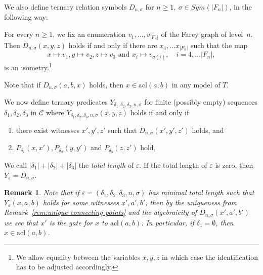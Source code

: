 \documentclass[10pt,a4paper]{amsart}
\renewcommand{\d}{\delta}
\renewcommand{\epsilon}{\varepsilon}
\newcommand{\C}{\mathcal{C}}
\newcommand{\acl}{\mathrm{acl}}
\newtheorem{remark}[defi]{Remark}
\begin{document}
We also define ternary relation symbols $D_{n,\sigma}$ for $n\geq 1,\ \sigma\in Sym(|F_n|)$, in the following way:

For every $n\geq 1$, we fix an enumeration $v_1,\ldots, v_{|F_n|}$ of the Farey graph of level~$n$. 
Then $D_{n,\sigma}(x,y,z)$ holds if and only if there are $x_4,\ldots x_{|F_n|}$ such that the map
\[x\mapsto v_1, y\mapsto v_2, z\mapsto v_3\mbox{\  and \ }x_i\mapsto v_{\sigma(i)},\quad i=4,\ldots |F_n|,\] is an isometry.\footnote{We allow equality between the variables $x, y, z$ in which case the identification has to be adjusted accordingly.}



Note that if $D_{n,\sigma}(a,b,x)$ holds, then $x\in\acl(a,b)$ in any model of $T$.

We now define ternary predicates $Y_{\d_1,\d_2,\d_3,n,\sigma}$
for finite (possibly empty) sequences $\d_1,\d_2,\d_3$ in $\C$
where $Y_{\d_1,\d_2,\d_3,n,\sigma}(x,y,z)$ holds
if and only if
\begin{enumerate}

\item there exist witnesses $x',y',z'$ such that $D_{n,\sigma}(x',y',z')$ holds, and
\item $P_{\d_1}(x,x'), P_{\d_2}(y,y')$ and $P_{\d_3}(z,z')$ hold.
\end{enumerate}

We call $|\d_1|+|\d_2|+|\d_3|$ the \emph{total length} of $\epsilon$. If the total length of $\epsilon$ is zero, then $Y_\epsilon=D_{n,\sigma}$.

\begin{remark}\label{rem:Y algebraic}
Note that if $\epsilon=(\d_1,\d_2,\d_3,n,\sigma)$ has minimal total length such that $Y_\epsilon(x,a,b)$ holds for some witnesses $x',a',b'$, then by the uniqueness from Remark~\ref{rem:unique connecting points} and the algebraicity of $D_{n,\sigma}(x',a',b')$  we see that $x'$ is the gate for $x$ to $\acl(a,b)$.
In particular, if $\d_1=\emptyset$, then $x\in\acl(a,b)$.
 
\end{remark}
\end{document}
